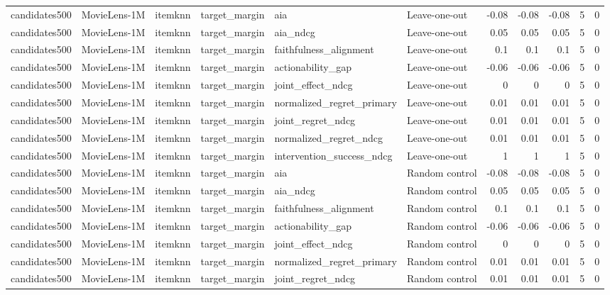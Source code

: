 \begin{table}[t]
{\begin{tabular}{llllllrrrrr}
candidates500 & MovieLens-1M & itemknn & target\_margin & aia & Leave-one-out & -0.08 & -0.08 & -0.08 & 5 & 0 \\
candidates500 & MovieLens-1M & itemknn & target\_margin & aia\_ndcg & Leave-one-out & 0.05 & 0.05 & 0.05 & 5 & 0 \\
candidates500 & MovieLens-1M & itemknn & target\_margin & faithfulness\_alignment & Leave-one-out & 0.1 & 0.1 & 0.1 & 5 & 0 \\
candidates500 & MovieLens-1M & itemknn & target\_margin & actionability\_gap & Leave-one-out & -0.06 & -0.06 & -0.06 & 5 & 0 \\
candidates500 & MovieLens-1M & itemknn & target\_margin & joint\_effect\_ndcg & Leave-one-out & 0 & 0 & 0 & 5 & 0 \\
candidates500 & MovieLens-1M & itemknn & target\_margin & normalized\_regret\_primary & Leave-one-out & 0.01 & 0.01 & 0.01 & 5 & 0 \\
candidates500 & MovieLens-1M & itemknn & target\_margin & joint\_regret\_ndcg & Leave-one-out & 0.01 & 0.01 & 0.01 & 5 & 0 \\
candidates500 & MovieLens-1M & itemknn & target\_margin & normalized\_regret\_ndcg & Leave-one-out & 0.01 & 0.01 & 0.01 & 5 & 0 \\
candidates500 & MovieLens-1M & itemknn & target\_margin & intervention\_success\_ndcg & Leave-one-out & 1 & 1 & 1 & 5 & 0 \\
candidates500 & MovieLens-1M & itemknn & target\_margin & aia & Random control & -0.08 & -0.08 & -0.08 & 5 & 0 \\
candidates500 & MovieLens-1M & itemknn & target\_margin & aia\_ndcg & Random control & 0.05 & 0.05 & 0.05 & 5 & 0 \\
candidates500 & MovieLens-1M & itemknn & target\_margin & faithfulness\_alignment & Random control & 0.1 & 0.1 & 0.1 & 5 & 0 \\
candidates500 & MovieLens-1M & itemknn & target\_margin & actionability\_gap & Random control & -0.06 & -0.06 & -0.06 & 5 & 0 \\
candidates500 & MovieLens-1M & itemknn & target\_margin & joint\_effect\_ndcg & Random control & 0 & 0 & 0 & 5 & 0 \\
candidates500 & MovieLens-1M & itemknn & target\_margin & normalized\_regret\_primary & Random control & 0.01 & 0.01 & 0.01 & 5 & 0 \\
candidates500 & MovieLens-1M & itemknn & target\_margin & joint\_regret\_ndcg & Random control & 0.01 & 0.01 & 0.01 & 5 & 0 \\

\end{tabular}}
\end{table}
